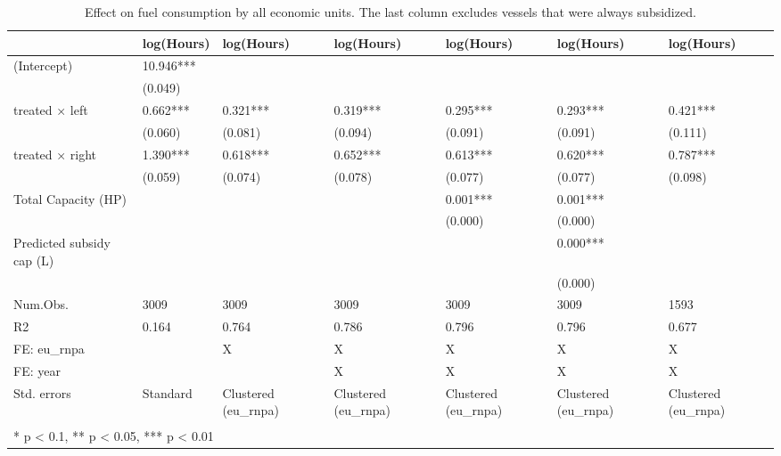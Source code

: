 \begin{table}

\caption{\label{tab:}Effect on fuel consumption by all economic units. The last column excludes vessels that were always subsidized.}
\centering
\begin{tabular}[t]{lllllll}
\toprule
  & log(Hours) & log(Hours)  & log(Hours)   & log(Hours)    & log(Hours)     & log(Hours)     \\
\midrule
(Intercept) & 10.946*** &  &  &  &  & \\
 & (0.049) &  &  &  &  & \\
treated × left & 0.662*** & 0.321*** & 0.319*** & 0.295*** & 0.293*** & 0.421***\\
 & (0.060) & (0.081) & (0.094) & (0.091) & (0.091) & (0.111)\\
treated × right & 1.390*** & 0.618*** & 0.652*** & 0.613*** & 0.620*** & 0.787***\\
 & (0.059) & (0.074) & (0.078) & (0.077) & (0.077) & (0.098)\\
Total Capacity (HP) &  &  &  & 0.001*** & 0.001*** & \\
 &  &  &  & (0.000) & (0.000) & \\
Predicted subsidy cap (L) &  &  &  &  & 0.000*** & \\
 &  &  &  &  & (0.000) & \\
\midrule
Num.Obs. & 3009 & 3009 & 3009 & 3009 & 3009 & 1593\\
R2 & 0.164 & 0.764 & 0.786 & 0.796 & 0.796 & 0.677\\
FE: eu\_rnpa &  & X & X & X & X & X\\
FE: year &  &  & X & X & X & X\\
Std. errors & Standard & Clustered (eu\_rnpa) & Clustered (eu\_rnpa) & Clustered (eu\_rnpa) & Clustered (eu\_rnpa) & Clustered (eu\_rnpa)\\
\bottomrule
\multicolumn{7}{l}{\textsuperscript{} * p < 0.1, ** p < 0.05, *** p < 0.01}\\
\end{tabular}
\end{table}
